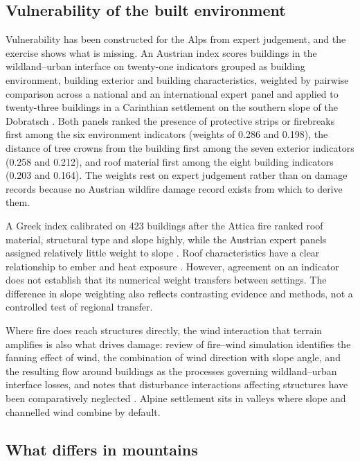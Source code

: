\documentclass[11pt,a4paper]{article}
\begin{document}
\subsection{Vulnerability of the built environment}

Vulnerability has been constructed for the Alps from expert judgement, and the exercise shows what is missing. An Austrian index scores buildings in the wildland--urban interface on twenty-one indicators grouped as building environment, building exterior and building characteristics, weighted by pairwise comparison across a national and an international expert panel and applied to twenty-three buildings in a Carinthian settlement on the southern slope of the Dobratsch \citep{papathomakohle_towards_2025}. Both panels ranked the presence of protective strips or firebreaks first among the six environment indicators (weights of 0.286 and 0.198), the distance of tree crowns from the building first among the seven exterior indicators (0.258 and 0.212), and roof material first among the eight building indicators (0.203 and 0.164). The weights rest on expert judgement rather than on damage records because no Austrian wildfire damage record exists from which to derive them.

A Greek index calibrated on 423 buildings after the Attica fire ranked roof material, structural type and slope highly, while the Austrian expert panels assigned relatively little weight to slope \citep{papathomakohle_wildfire_2022, papathomakohle_towards_2025}. Roof characteristics have a clear relationship to ember and heat exposure \citep{naser_vulnerability_2025}. However, agreement on an indicator does not establish that its numerical weight transfers between settings. The difference in slope weighting also reflects contrasting evidence and methods, not a controlled test of regional transfer.

Where fire does reach structures directly, the wind interaction that terrain amplifies is also what drives damage: review of fire--wind simulation identifies the fanning effect of wind, the combination of wind direction with slope angle, and the resulting flow around buildings as the processes governing wildland--urban interface losses, and notes that disturbance interactions affecting structures have been comparatively neglected \citep{ghodrat_existing_2021}. Alpine settlement sits in valleys where slope and channelled wind combine by default.

\subsection{What differs in mountains}
\end{document}
